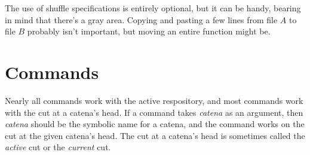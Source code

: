 \documentclass[10pt]{article}
\begin{document}
The use of shuffle specifications is entirely optional, but it can be
handy, bearing in mind that there's a gray area. Copying and pasting
a few lines from file $A$ to file $B$ probably isn't important, but moving
an entire function might be.

\section{Commands}

Nearly all commands work with the active respository, and most
commands work with the cut at a catena's head. If a command takes
{\it catena} as an argument, then {\it catena} should be the
symbolic name for a catena, and the command works on the cut at
the given catena's head. The cut at a catena's head is sometimes
called the {\it active} cut or the {\it current} cut.
\vskip 0.4cm
\end{document}
